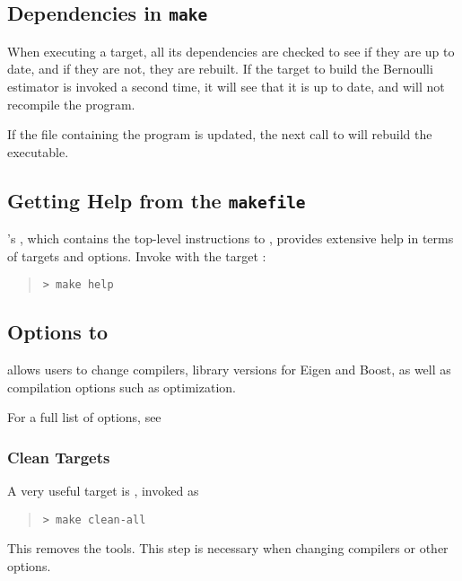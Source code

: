 \subsection{Dependencies in {\tt\bfseries make}}

When executing a  target, all its dependencies are checked
to see if they are up to date, and if they are not, they are rebuilt.
If the  target to build the Bernoulli estimator is invoked
a second time, it will see that it is up to date, and will not
recompile the program.

If the file containing the \Stan program is updated, the next call to
 will rebuild the \CmdStan executable.


\subsection{Getting Help from the {\tt makefile}}

\CmdStan's , which contains the top-level instructions to
, provides extensive help in terms of targets and options. Invoke
 with the target :
%
\begin{quote}
\begin{Verbatim}[fontshape=sl]
> make help
\end{Verbatim}
\end{quote}

\subsection{Options to }

\CmdStan allows users to change compilers, library versions for Eigen
and Boost, as well as compilation options such as optimization.

For a full list of options, see 



\subsubsection{Clean Targets}

A very useful target is , invoked as
%
\begin{quote}
\begin{Verbatim}[fontshape=sl]
> make clean-all
\end{Verbatim}
\end{quote}
%
This removes the \CmdStan tools. This step is necessary when changing
compilers or other  options.
